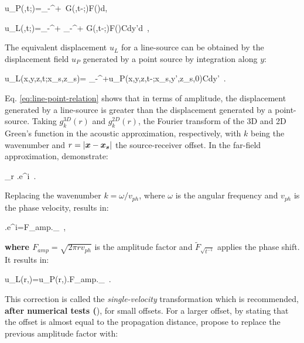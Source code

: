 \documentclass[extra,mreferee]{gji}
\newenvironment{greennote}{\par\color{OliveGreen}}{\par}
\begin{document}
\begin{greennote}
\equation
u_{P}(,t;)=\int_{-\infty}^{+\infty}\ G(,t-\tau;)F(\tau)d\tau, 
\label{eq:point-displacement}
\endequation

\equation
u_{L}(,t;)=\int_{-\infty}^{+\infty} \int_{-\infty}^{+\infty} G(,t-\tau;)F(\tau)Cdy'd\tau\ , \label{eq:line-displacement}
\endequation

The equivalent displacement $u_{L}$ for a line-source can be obtained by the displacement field $u_{P}$ generated by a point source by integration along $y$:

\equation
u_{L}(x,y,z,t;x_{s},z_{s})= \int_{-\infty}^{+\infty}u_{P}(x,y,z,t-\tau;x_{s},y',z_{s},0)Cdy'\ .
\label{eq:line-point-relation}
\endequation

Eq. \ref{eq:line-point-relation} shows that in terms of amplitude, the displacement generated by a line-source is greater than the displacement generated by a point-source.
Taking $g_{k}^{3D}(r)$ and $g_{k}^{2D}(r)$, the Fourier transform of the 3D and 2D Green's function in the acoustic approximation, respectively, with $k$ being the wavenumber and $r=|\mitbf{x}-\mitbf{x_{s}}|$ the source-receiver offset. In the far-field approximation, \cite{Forbriger_LSS_2014} demonstrate:

\equation
\lim\limits_{r \rightarrow \infty} \approx {}.e^{i}\ .
\label{eq:far-field-frac}
\endequation

Replacing the wavenumber $k=\omega/v_{ph}$, where $\omega$ is the angular frequency and $v_{ph}$ is the phase velocity, results in:

\equation
{}.\sqrt{\frac{\pi}{\omega}}e^{i}=F_{amp}._{}\ ,
\endequation

\textbf{where $F_{amp}=\sqrt{2\pi r v_{ph}}$} is the amplitude factor and $\widetilde{F}_{\sqrt{t^{-1}}}$ applies the phase shift. It results in:

\equation
u_{L}(r,\omega)=u_{P}(r,\omega).F_{amp}._{}\ .
\label{eq:single-velocity}
\endequation

This correction is called the \textit{single-velocity} transformation which is recommended, \textbf{after numerical tests (\cite{Forbriger_LSS_2014, schafer2014lss}}), for small offsets. For a larger offset, by stating that the offset is almost equal to the propagation distance, \cite{schafer2014lss} propose to replace the previous amplitude factor with:


\end{greennote}
\end{document}
